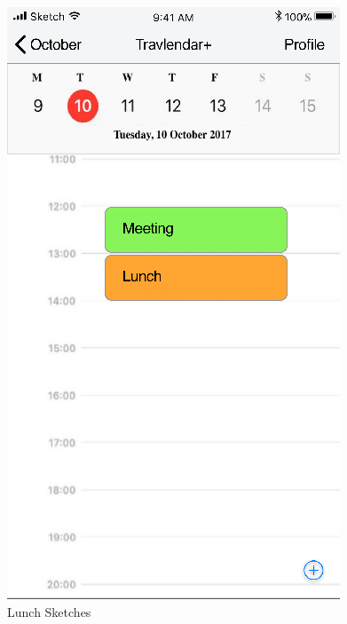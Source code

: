 \begin{figure}[H]
	\hspace{0.5cm}
	\includegraphics[scale=0.23]{Images/Interface/Lunch/4_calendar+meeting+lunch}
	\caption{Lunch Sketches}
\end{figure}


